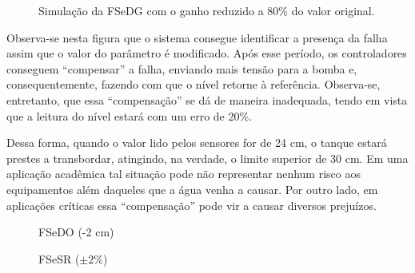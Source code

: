 \begin{figure}[htb]
\footnotesize
\centering

\vspace{1cm}
\caption{Simulação da FSeDG com o ganho reduzido a 80\% do valor original.}
\label{fig:fsedg}
\end{figure}

Observa-se nesta figura que o sistema consegue identificar a presença da falha
assim que o valor do parâmetro é modificado. Após esse período, os controladores
conseguem ``compensar'' a falha, enviando mais tensão para a bomba e,
consequentemente, fazendo com que o nível retorne à referência. Observa-se,
entretanto, que essa ``compensação'' se dá de maneira inadequada, tendo em vista
que a leitura do nível estará com um erro de 20\%. 

Dessa forma, quando o valor lido pelos sensores for de 24 cm, o tanque estará
prestes a transbordar, atingindo, na verdade, o limite superior de 30 cm. Em uma
aplicação acadêmica tal situação pode não representar nenhum risco aos
equipamentos além daqueles que a água venha a causar. Por outro lado, em
aplicações críticas essa ``compensação'' pode vir a causar diversos prejuízos.



\begin{figure}[htb]
\footnotesize
\centering

\vspace{1cm}
\caption{FSeDO (-2 cm)}
\label{fig:fsedo}
\end{figure}

\begin{figure}[htb]
\footnotesize
\centering

\vspace{1cm}
\caption{FSeSR ($\pm 2\%$)}
\label{fig:fsesr}
\end{figure}

